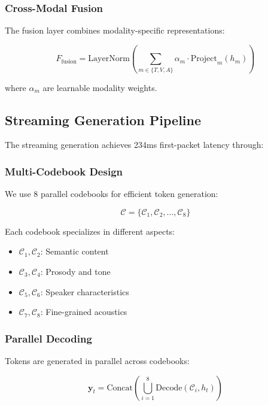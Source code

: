 \subsubsection{Cross-Modal Fusion}
The fusion layer combines modality-specific representations:

\begin{equation}
F_{\text{fusion}} = \text{LayerNorm}\left(\sum_{m \in \{T, V, A\}} \alpha_m \cdot \text{Project}_m(h_m)\right)
\end{equation}

where $\alpha_m$ are learnable modality weights.

\subsection{Streaming Generation Pipeline}

The streaming generation achieves 234ms first-packet latency through:

\subsubsection{Multi-Codebook Design}
We use 8 parallel codebooks for efficient token generation:

\begin{equation}
\mathcal{C} = \{\mathcal{C}_1, \mathcal{C}_2, ..., \mathcal{C}_8\}
\end{equation}

Each codebook specializes in different aspects:
\begin{itemize}
    \item $\mathcal{C}_1, \mathcal{C}_2$: Semantic content
    \item $\mathcal{C}_3, \mathcal{C}_4$: Prosody and tone
    \item $\mathcal{C}_5, \mathcal{C}_6$: Speaker characteristics
    \item $\mathcal{C}_7, \mathcal{C}_8$: Fine-grained acoustics
\end{itemize}

\subsubsection{Parallel Decoding}
Tokens are generated in parallel across codebooks:

\begin{equation}
\mathbf{y}_t = \text{Concat}\left(\bigcup_{i=1}^{8} \text{Decode}(\mathcal{C}_i, h_t)\right)
\end{equation}

